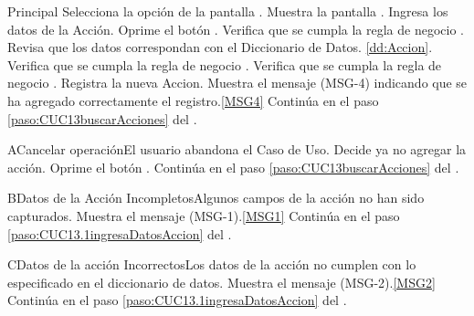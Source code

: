 	\begin{UCtrayectoria}{Principal}
			\UCpaso[\UCactor] Selecciona la opción  de la pantalla . %
			\UCpaso Muestra la pantalla .
			\UCpaso [\UCactor] Ingresa los datos de la Acción. \label{paso:CUC13.1ingresaDatosAccion}
			\UCpaso [\UCactor] Oprime el botón .
			\UCpaso Verifica que se cumpla la regla de negocio .  
			\UCpaso Revisa que los datos correspondan con el Diccionario de Datos. \ref{dd:Accion}. 
			\UCpaso Verifica que se cumpla la regla de negocio .  
			\UCpaso Verifica que se cumpla la regla de negocio .  
			\UCpaso Registra la nueva Accion.
			\UCpaso Muestra el mensaje (MSG-4) indicando que se ha agregado correctamente el registro.\ref{MSG4}
			\UCpaso Continúa en el paso \ref{paso:CUC13buscarAcciones} del .
	\end{UCtrayectoria}

	\begin{UCtrayectoriaA}{A}{Cancelar operación}{El usuario abandona el Caso de Uso.}
			\UCpaso[\UCactor] Decide ya no agregar la acción.
			\UCpaso[\UCactor] Oprime el botón .
			\UCpaso Continúa en el paso \ref{paso:CUC13buscarAcciones} del .
	\end{UCtrayectoriaA}
		
	\begin{UCtrayectoriaA}{B}{Datos de la Acción Incompletos}{Algunos campos de la acción no han sido capturados.}
			\UCpaso Muestra el mensaje (MSG-1).\ref{MSG1}
			\UCpaso Continúa en el paso \ref{paso:CUC13.1ingresaDatosAccion} del .
	\end{UCtrayectoriaA}

	\begin{UCtrayectoriaA}{C}{Datos de la acción Incorrectos}{Los datos de la acción no cumplen con lo especificado en el diccionario de datos.}
			\UCpaso Muestra el mensaje (MSG-2).\ref{MSG2}
			\UCpaso Continúa en el paso \ref{paso:CUC13.1ingresaDatosAccion} del .
	\end{UCtrayectoriaA}


